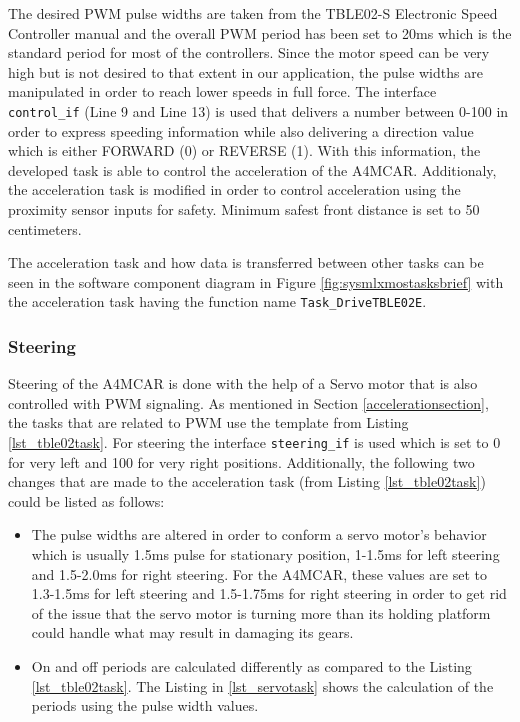 \newpage
The desired PWM pulse widths are taken from the TBLE02-S Electronic Speed Controller manual and the overall PWM period has been set to 20ms which is the standard period for most of the controllers. Since the motor speed can be very high but is not desired to that extent in our application, the pulse widths are manipulated in order to reach lower speeds in full force. The interface \texttt{control\texttt{\_}if} (Line 9 and Line 13) is used that delivers a number between 0-100 in order to express speeding information while also delivering a direction value which is either FORWARD (0) or REVERSE (1). With this information, the developed task is able to control the acceleration of the A4MCAR. Additionaly, the acceleration task is modified in order to control acceleration using the proximity sensor inputs for safety. Minimum safest front distance is set to 50 centimeters.

The acceleration task and how data is transferred between other tasks can be seen in the software component diagram in Figure \ref{fig:sysmlxmostasksbrief} with the acceleration task having the function name \texttt{Task\texttt{\_}DriveTBLE02E}.

\subsubsection{Steering}
Steering of the A4MCAR is done with the help of a Servo motor that is also controlled with PWM signaling. As mentioned in Section \ref{accelerationsection}, the tasks that are related to PWM use the template from Listing \ref{lst_tble02task}. For steering the interface \texttt{steering\texttt{\_}if} is used which is set to 0 for very left and 100 for very right positions. Additionally, the following two changes that are made to the acceleration task (from Listing \ref{lst_tble02task}) could be listed as follows:
\begin{itemize}
	\item The pulse widths are altered in order to conform a servo motor's behavior which is usually 1.5ms pulse for stationary position, 1-1.5ms for left steering and 1.5-2.0ms for right steering. For the A4MCAR, these values are set to 1.3-1.5ms for left steering and 1.5-1.75ms for right steering in order to get rid of the issue that the servo motor is turning more than its holding platform could handle what may result in damaging its gears.
	\item On and off periods are calculated differently as compared to the Listing \ref{lst_tble02task}. The Listing in \ref{lst_servotask} shows the calculation of the periods using the pulse width values.
	
\end{itemize}

